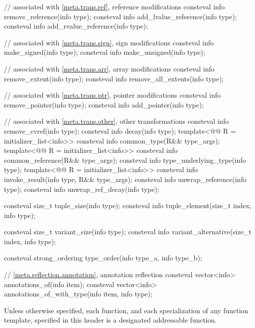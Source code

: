 \begin{codeblock}
{  // associated with \ref{meta.trans.ref}, reference modifications
  consteval info remove_reference(info type);
  consteval info add_lvalue_reference(info type);
  consteval info add_rvalue_reference(info type);

  // associated with \ref{meta.trans.sign}, sign modifications
  consteval info make_signed(info type);
  consteval info make_unsigned(info type);

  // associated with \ref{meta.trans.arr}, array modifications
  consteval info remove_extent(info type);
  consteval info remove_all_extents(info type);

  // associated with \ref{meta.trans.ptr}, pointer modifications
  consteval info remove_pointer(info type);
  consteval info add_pointer(info type);

  // associated with \ref{meta.trans.other}, other transformations
  consteval info remove_cvref(info type);
  consteval info decay(info type);
  template<@@ R = initializer_list<info>>
    consteval info common_type(R&& type_args);
  template<@@ R = initializer_list<info>>
    consteval info common_reference(R&& type_args);
  consteval info type_underlying_type(info type);
  template<@@ R = initializer_list<info>>
    consteval info invoke_result(info type, R&& type_args);
  consteval info unwrap_reference(info type);
  consteval info unwrap_ref_decay(info type);

  consteval size_t tuple_size(info type);
  consteval info tuple_element(size_t index, info type);

  consteval size_t variant_size(info type);
  consteval info variant_alternative(size_t index, info type);

  consteval strong_ordering type_order(info type_a, info type_b);

  // \ref{meta.reflection.annotation}, annotation reflection
  consteval vector<info> annotations_of(info item);
  consteval vector<info> annotations_of_with_type(info item, info type);
}
\end{codeblock}

\pnum
Unless otherwise specified,
each function, and each specialization of any function template,
specified in this header
is a designated addressable function.

